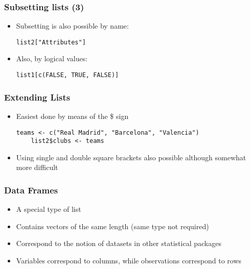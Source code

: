\documentclass[10pt]{beamer}
\theoremstyle{definition}
\begin{document}
\begin{frame}[fragile]
\frametitle{Subsetting lists (3)}
\begin{itemize}
	\item Subsetting is also possible by name:
	\begin{lstlisting}[style = rstyle, breaklines]
	list2["Attributes"]
	\end{lstlisting}

	\item Also, by logical values:
	\begin{lstlisting}[style = rstyle, breaklines]
	list1[c(FALSE, TRUE, FALSE)]
	\end{lstlisting}
\end{itemize}
\end{frame}

\begin{frame}[fragile]
\frametitle{Extending Lists}
\begin{itemize}
	\item Easiest done by means of the \$ sign
	\begin{lstlisting}[style = rstyle, breaklines]
	teams <- c("Real Madrid", "Barcelona", "Valencia")
	list2$clubs <- teams
	\end{lstlisting}

	\item Using single and double square brackets also possible although somewhat more difficult
\end{itemize}

\end{frame}

\begin{frame}
\frametitle{Data Frames}
\begin{itemize}
	\item A special type of list
	
	\item Contains vectors of the same length (same type not required)
	
	\item Correspond to the notion of datasets in other statistical packages
	
	\item Variables correspond to columns, while observations correspond to rows
\end{itemize}
\end{frame}
\end{document}
